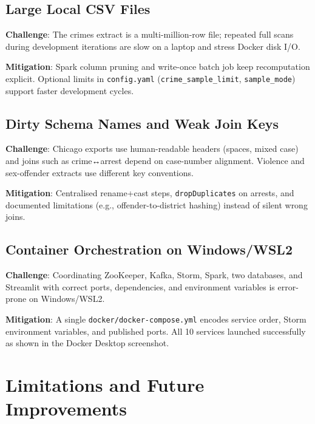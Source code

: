 \documentclass[12pt,a4paper]{article}
\begin{document}
\subsection{Large Local CSV Files}

\textbf{Challenge}: The crimes extract is a multi-million-row file; repeated full scans during development iterations are slow on a laptop and stress Docker disk I/O.

\textbf{Mitigation}: Spark column pruning and write-once batch job keep recomputation explicit. Optional limits in \texttt{config.yaml} (\texttt{crime\_sample\_limit}, \texttt{sample\_mode}) support faster development cycles.

\subsection{Dirty Schema Names and Weak Join Keys}

\textbf{Challenge}: Chicago exports use human-readable headers (spaces, mixed case) and joins such as crime↔arrest depend on case-number alignment. Violence and sex-offender extracts use different key conventions.

\textbf{Mitigation}: Centralised rename+cast steps, \texttt{dropDuplicates} on arrests, and documented limitations (e.g., offender-to-district hashing) instead of silent wrong joins.

\subsection{Container Orchestration on Windows/WSL2}

\textbf{Challenge}: Coordinating ZooKeeper, Kafka, Storm, Spark, two databases, and Streamlit with correct ports, dependencies, and environment variables is error-prone on Windows/WSL2.

\textbf{Mitigation}: A single \texttt{docker/docker-compose.yml} encodes service order, Storm environment variables, and published ports. All 10 services launched successfully as shown in the Docker Desktop screenshot.

\section{Limitations and Future Improvements}
\end{document}
